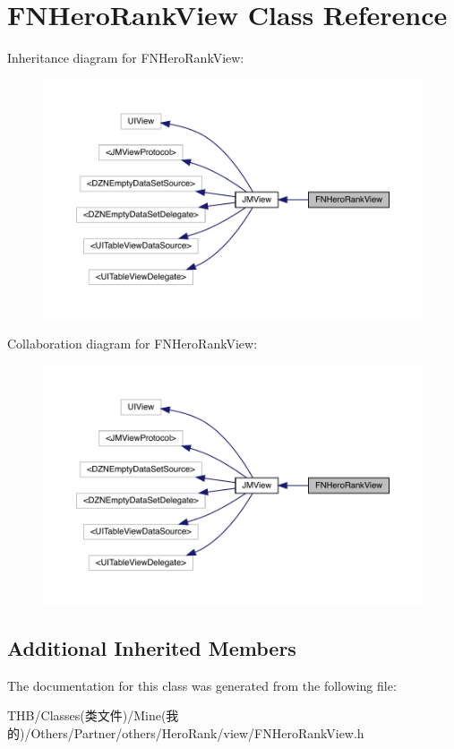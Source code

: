 \hypertarget{interface_f_n_hero_rank_view}{}\section{F\+N\+Hero\+Rank\+View Class Reference}
\label{interface_f_n_hero_rank_view}


Inheritance diagram for F\+N\+Hero\+Rank\+View\+:\nopagebreak
\begin{figure}[H]
\begin{center}
\leavevmode
\includegraphics[width=350pt]{interface_f_n_hero_rank_view__inherit__graph}
\end{center}
\end{figure}


Collaboration diagram for F\+N\+Hero\+Rank\+View\+:\nopagebreak
\begin{figure}[H]
\begin{center}
\leavevmode
\includegraphics[width=350pt]{interface_f_n_hero_rank_view__coll__graph}
\end{center}
\end{figure}
\subsection*{Additional Inherited Members}


The documentation for this class was generated from the following file\+:\begin{DoxyCompactItemize}
\item 
T\+H\+B/\+Classes(类文件)/\+Mine(我的)/\+Others/\+Partner/others/\+Hero\+Rank/view/F\+N\+Hero\+Rank\+View.\+h\end{DoxyCompactItemize}
